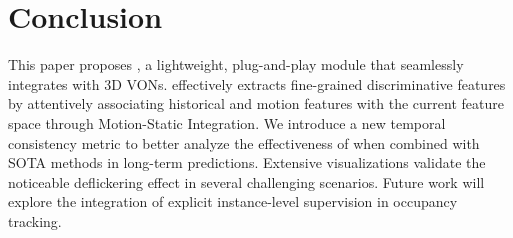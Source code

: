 \section{Conclusion}
\label{sec:con}

This paper proposes \ours, a lightweight, plug-and-play module that seamlessly integrates with 3D VONs. \ours effectively extracts fine-grained discriminative features by attentively associating historical and motion features with the current feature space through Motion-Static Integration. We introduce a new temporal consistency metric to better analyze the effectiveness of \ours when combined with SOTA methods in long-term predictions. Extensive visualizations validate the noticeable deflickering effect in several challenging scenarios. Future work will explore the integration of explicit instance-level supervision in occupancy tracking.